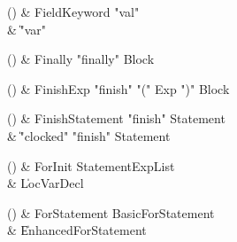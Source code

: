 \begin{bbgrammarappendix}

() & FieldKeyword \label{prod:FieldKeyword}  \: \xcd"val"  \\

 &    \| \xcd"var" \\

\end{bbgrammarappendix}

\begin{bbgrammarappendix}

() & Finally \label{prod:Finally}  \: \xcd"finally" Block  \\


\end{bbgrammarappendix}

\begin{bbgrammarappendix}

() & FinishExp \label{prod:FinishExp}  \: \xcd"finish" \xcd"(" Exp \xcd")" Block  \\


\end{bbgrammarappendix}

\begin{bbgrammarappendix}

() & FinishStatement \label{prod:FinishStatement}  \: \xcd"finish" Statement  \\

 &    \| \xcd"clocked" \xcd"finish" Statement \\

\end{bbgrammarappendix}

\begin{bbgrammarappendix}

() & ForInit \label{prod:ForInit}  \: StatementExpList  \\

 &    \| LocVarDecl \\

\end{bbgrammarappendix}

\begin{bbgrammarappendix}

() & ForStatement \label{prod:ForStatement}  \: BasicForStatement  \\

 &    \| EnhancedForStatement \\

\end{bbgrammarappendix}


